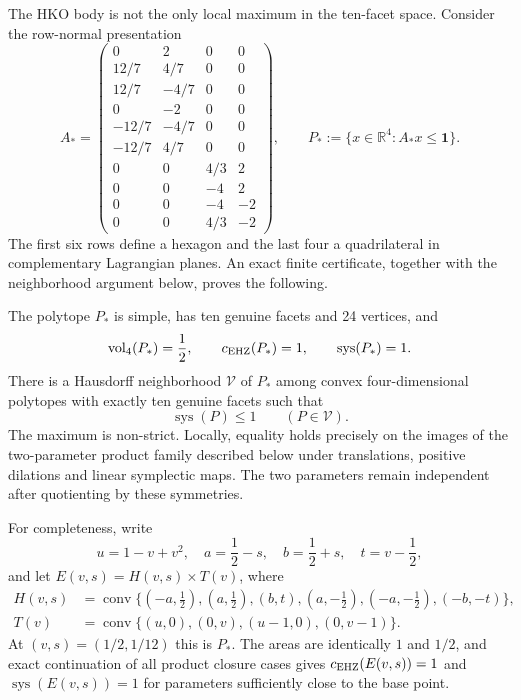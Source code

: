 The HKO body is not the only local maximum in the ten-facet space. Consider
the row-normal presentation
\[
A_* =
\begin{pmatrix}
0&2&0&0\\
12/7&4/7&0&0\\
12/7&-4/7&0&0\\
0&-2&0&0\\
-12/7&-4/7&0&0\\
-12/7&4/7&0&0\\
0&0&4/3&2\\
0&0&-4&2\\
0&0&-4&-2\\
0&0&4/3&-2
\end{pmatrix},
\qquad
P_*:=\{x\in\mathbb R^4:A_*x\leq\mathbf1\}.
\]
The first six rows define a hexagon and the last four a quadrilateral in
complementary Lagrangian planes. An exact finite certificate, together with
the neighborhood argument below, proves the following.

\begin{theorem}
\label{thm:non-hko-ten-facet-local-maximum}
The polytope $P_*$ is simple, has ten genuine facets and 24 vertices, and
\[
 \operatorname{vol}_4(P_*)=\frac12,
 \qquad c_{\rm EHZ}(P_*)=1,
 \qquad \operatorname{sys}(P_*)=1.
\]
There is a Hausdorff neighborhood $\mathcal V$ of $P_*$ among convex
four-dimensional polytopes with exactly ten genuine facets such that
\[
 \operatorname{sys}(P)\leq1\qquad(P\in\mathcal V).
\]
The maximum is non-strict. Locally, equality holds precisely on the images
of the two-parameter product family described below under translations,
positive dilations and linear symplectic maps. The two parameters remain
independent after quotienting by these symmetries.
\end{theorem}

For completeness, write
\[
 u=1-v+v^2,\quad a=\frac12-s,\quad b=\frac12+s,\quad t=v-\frac12,
\]
and let $E(v,s)=H(v,s)\times T(v)$, where
\[
\begin{split}
H(v,s)&=\operatorname{conv}\{(-a,\tfrac12),(a,\tfrac12),(b,t),
 (a,-\tfrac12),(-a,-\tfrac12),(-b,-t)\},\\
T(v)&=\operatorname{conv}\{(u,0),(0,v),(u-1,0),(0,v-1)\}.
\end{split}
\]
At $(v,s)=(1/2,1/12)$ this is $P_*$. The areas are identically $1$ and
$1/2$, and exact continuation of all product closure cases gives
\(c_{\rm EHZ}(E(v,s))=1\) and $\operatorname{sys}(E(v,s))=1$ for parameters
sufficiently close to the base point.

